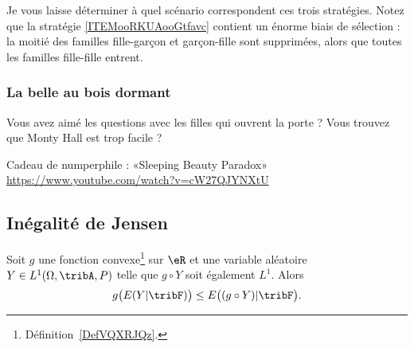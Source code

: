 Je vous laisse déterminer à quel scénario correspondent ces trois stratégies. Notez que la stratégie \ref{ITEMooRKUAooGtfavc} contient un énorme biais de sélection : la moitié des familles fille-garçon et garçon-fille sont supprimées, alors que toutes les familles fille-fille entrent.

\subsubsection{La belle au bois dormant}

Vous avez aimé les questions avec les filles qui ouvrent la porte ? Vous trouvez que Monty Hall est trop facile ?

Cadeau de numperphile : «Sleeping Beauty Paradox» \url{https://www.youtube.com/watch?v=cW27QJYNXtU}

\subsection{Inégalité de Jensen}

\begin{proposition}    \label{PropABtKbBo}
	Soit \( g\) une fonction convexe\footnote{Définition~\ref{DefVQXRJQz}.} sur \( \eR\) et une variable aléatoire \( Y\in L^1(\Omega,\tribA,P)\) telle que \( g\circ Y\) soit également \( L^1\). Alors
	\begin{equation}
		g\big( E(Y|\tribF) \big)\leq E\big( (g\circ Y)|\tribF \big).
	\end{equation}
\end{proposition}

